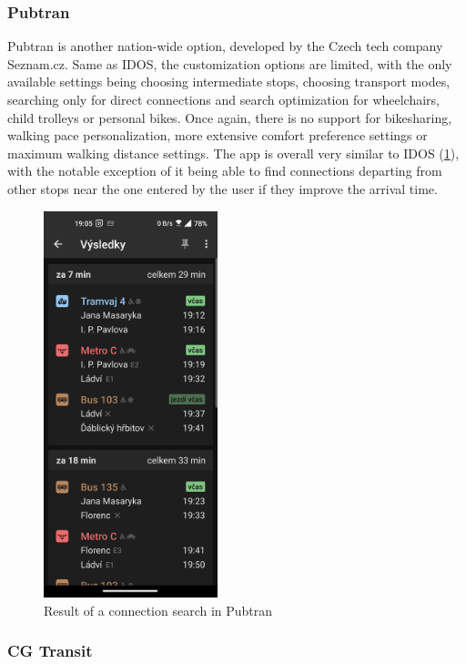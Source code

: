 \subsubsection{Pubtran}

Pubtran is another nation-wide option, developed by the Czech tech company Seznam.cz. Same as IDOS, the customization options are limited, with the only available settings being choosing intermediate stops, choosing transport modes, searching only for direct connections and search optimization for wheelchairs, child trolleys or personal bikes. Once again, there is no support for bikesharing, walking pace personalization, more extensive comfort preference settings or maximum walking distance settings. The app is overall very similar to IDOS (\cref{fig:pubtran}), with the notable exception of it being able to find connections departing from other stops near the one entered by the user if they improve the arrival time.

\begin{figure}[h!]
    \centering
    \includegraphics[width=0.45\textwidth]{img/screenshots/pubtran_result.jpg}
    \caption{Result of a connection search in Pubtran}
    \label{fig:pubtran}
\end{figure}

\subsubsection{CG Transit}

